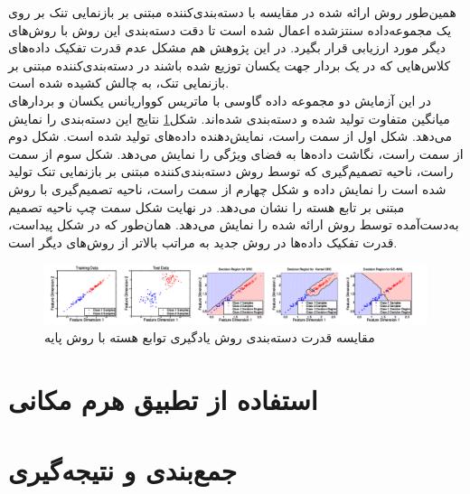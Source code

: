 \documentclass[12pt,twocolumn]{article}
\begin{document}
همین‌طور روش ارائه شده در مقایسه با دسته‌بندی‌کننده مبتنی بر بازنمایی تنک بر روی یک مجموعه‌داده سنتزشده اعمال شده است تا دقت دسته‌بندی این روش با روش‌های دیگر مورد ارزیابی قرار بگیرد. در این پژوهش هم مشکل عدم قدرت تفکیک داده‌های کلاس‌هایی که در یک بردار جهت یکسان توزیع شده باشند در دسته‌بندی‌کننده مبتنی بر بازنمایی تنک، به چالش کشیده شده است. 
\\
در این آزمایش دو مجموعه داده گاوسی با ماتریس کوواریانس یکسان و بردارهای میانگین متفاوت تولید شده و دسته‌بندی شده‌اند. شکل‌\ref{fig:3-1} نتایج این دسته‌بندی را نمایش می‌دهد. شکل اول از سمت راست، نمایش‌دهنده داده‌های تولید شده است. شکل دوم از سمت راست، نگاشت داده‌ها به فضای ویژگی را نمایش می‌دهد. شکل سوم از سمت راست، ناحیه تصمیم‌گیری که توسط روش دسته‌بندی‌کننده مبتنی بر بازنمایی تنک تولید شده است را نمایش داده و شکل چهارم از سمت راست، ناحیه تصمیم‌گیری با روش مبتنی بر تابع هسته را نشان می‌دهد. در نهایت شکل سمت چپ ناحیه تصمیم به‌دست‌آمده توسط روش ارائه شده را نمایش می‌دهد. همان‌طور که در شکل پیداست، قدرت تفکیک داده‌ها در روش جدید به مراتب بالاتر از روش‌های دیگر است.


\begin{figure}[t]
\centering
\includegraphics[width=\textwidth]{Imgs/3-1.png}
\caption{مقایسه قدرت دسته‌بندی روش یادگیری توابع هسته با روش پایه \cite{shrivastava2014multiple}}
\label{fig:3-1}
\end{figure}


\section{استفاده از تطبیق هرم مکانی}



\section{جمع‌بندی و نتیجه‌گیری}
    
    
    
\newpage


\end{document}
